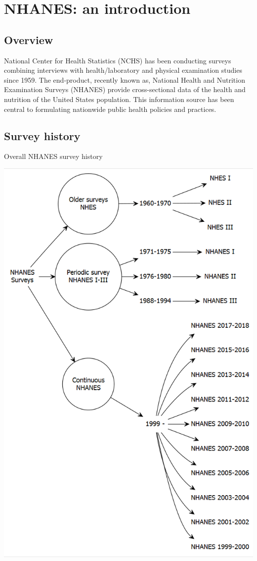 \documentclass[
]{book}
\begin{document}
\hypertarget{nhanes-an-introduction}{%
\chapter{NHANES: an introduction}\label{nhanes-an-introduction}}

\hypertarget{overview}{%
\section{Overview}\label{overview}}

National Center for Health Statistics (NCHS) has been conducting surveys combining interviews with health/laboratory and physical examination studies since 1959. The end-product, recently known as, National Health and Nutrition Examination Surveys (NHANES) provide cross-sectional data of the health and nutrition of the United States population. This information source has been central to formulating nationwide public health policies and practices.

\hypertarget{survey-history}{%
\section{Survey history}\label{survey-history}}

Overall NHANES survey history

\includegraphics[width=0.65\linewidth]{images/g1}
\end{document}
